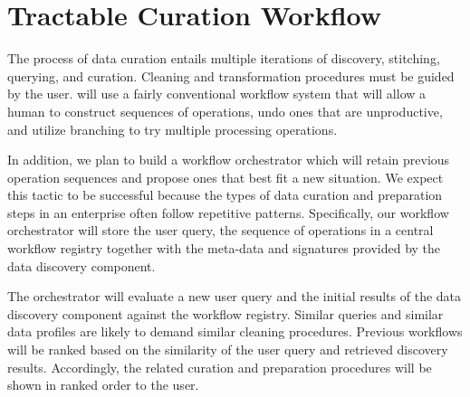 \section{Tractable Curation Workflow}
\label{sec:workflow}

The process of data curation entails multiple iterations of discovery,
stitching, querying, and curation. Cleaning and
transformation procedures must be guided by the user. \dcv will use a fairly
conventional workflow system that will allow a human to construct sequences of
operations, undo ones that are unproductive, and utilize branching to try
multiple processing operations.


In addition, we plan to build a workflow orchestrator which will retain previous
operation sequences and propose ones that best fit a new situation. We
expect this tactic to be successful because the types of data curation and
preparation steps in an enterprise often follow repetitive patterns.
Specifically, our workflow orchestrator will store the user query, the sequence
of operations in a central workflow registry together with the meta-data and
signatures provided by the data discovery component. 


The orchestrator will evaluate a new user query and the initial results of
the data discovery component against the workflow registry. Similar queries and
similar data profiles are likely to demand similar cleaning procedures. Previous
workflows will be ranked based on the similarity of the user query and retrieved
discovery results. Accordingly, the related curation and preparation procedures
will be shown in ranked order to the user.
